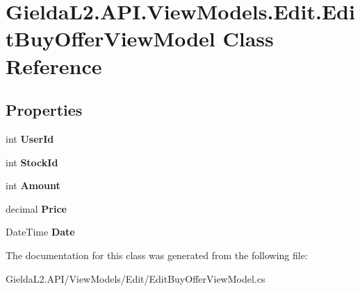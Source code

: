 \hypertarget{class_gielda_l2_1_1_a_p_i_1_1_view_models_1_1_edit_1_1_edit_buy_offer_view_model}{}\section{Gielda\+L2.\+A\+P\+I.\+View\+Models.\+Edit.\+Edit\+Buy\+Offer\+View\+Model Class Reference}
\label{class_gielda_l2_1_1_a_p_i_1_1_view_models_1_1_edit_1_1_edit_buy_offer_view_model}
\subsection*{Properties}
\begin{DoxyCompactItemize}
\item 
\mbox{\label{class_gielda_l2_1_1_a_p_i_1_1_view_models_1_1_edit_1_1_edit_buy_offer_view_model_a219999affd6dd789e9fbfdb9fcb8e095}} 
int {\bfseries User\+Id}
\item 
\mbox{\label{class_gielda_l2_1_1_a_p_i_1_1_view_models_1_1_edit_1_1_edit_buy_offer_view_model_afb9a704a3af49a05577bb11fcd248b68}} 
int {\bfseries Stock\+Id}
\item 
\mbox{\label{class_gielda_l2_1_1_a_p_i_1_1_view_models_1_1_edit_1_1_edit_buy_offer_view_model_a4cf13f8377d6ea84e460a186f37892a6}} 
int {\bfseries Amount}
\item 
\mbox{\label{class_gielda_l2_1_1_a_p_i_1_1_view_models_1_1_edit_1_1_edit_buy_offer_view_model_aeb5f1392c1524e748674e1d0be9c1448}} 
decimal {\bfseries Price}
\item 
\mbox{\label{class_gielda_l2_1_1_a_p_i_1_1_view_models_1_1_edit_1_1_edit_buy_offer_view_model_a1834f6048606cd00b7548ee4657deda8}} 
Date\+Time {\bfseries Date}
\end{DoxyCompactItemize}


The documentation for this class was generated from the following file\+:\begin{DoxyCompactItemize}
\item 
Gielda\+L2.\+A\+P\+I/\+View\+Models/\+Edit/Edit\+Buy\+Offer\+View\+Model.\+cs\end{DoxyCompactItemize}
